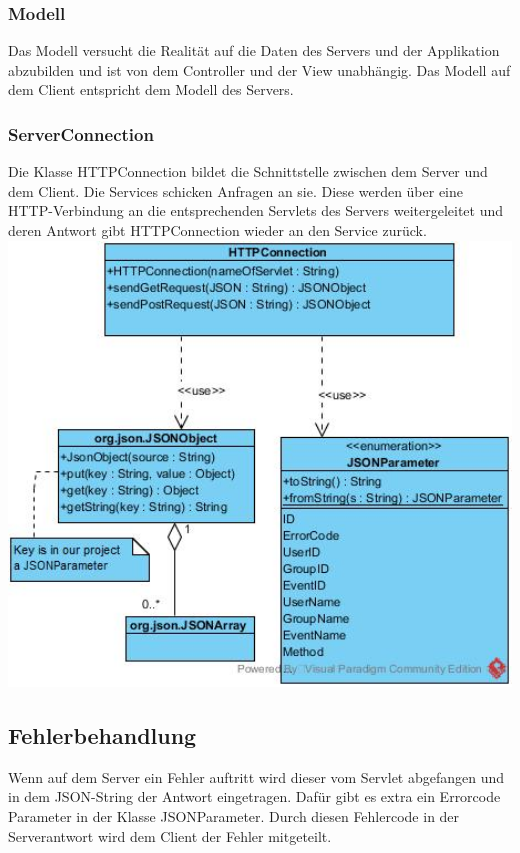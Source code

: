 	\subsubsection{Modell}
Das Modell versucht die Realität auf die Daten des Servers und der Applikation abzubilden und ist von dem Controller und der View unabhängig. 
Das Modell auf dem Client entspricht dem Modell des Servers.

	\subsubsection{ServerConnection}
	Die Klasse HTTPConnection bildet die Schnittstelle zwischen dem Server und dem Client. Die Services schicken Anfragen an sie. Diese werden über eine HTTP-Verbindung an die entsprechenden Servlets des Servers weitergeleitet und deren Antwort gibt HTTPConnection wieder an den Service zurück.
		\newline
		\includegraphics[width=1\textwidth]{HTTPClientClassDiagram.jpg}

	\subsection{Fehlerbehandlung}
Wenn auf dem Server ein Fehler auftritt wird dieser vom Servlet abgefangen und in dem JSON-String der Antwort eingetragen. Dafür gibt es extra ein Errorcode Parameter in der Klasse JSONParameter. Durch diesen Fehlercode in der Serverantwort wird dem Client der Fehler mitgeteilt.\par

